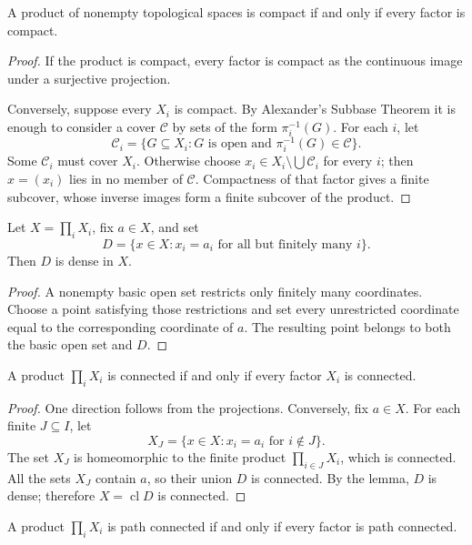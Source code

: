 \begin{thm}
A product of nonempty topological spaces is compact if and only if every
factor is compact.
\end{thm}

\begin{proof}
If the product is compact, every factor is compact as the continuous image
under a surjective projection.

Conversely, suppose every $X_i$ is compact. By Alexander's Subbase Theorem it
is enough to consider a cover $\mathcal{C}$ by sets of the form
$\pi_i^{-1}(G)$. For each $i$, let
\[
\mathcal{C}_i=\{G\subseteq X_i:G\text{ is open and }
\pi_i^{-1}(G)\in\mathcal{C}\}.
\]
Some $\mathcal{C}_i$ must cover $X_i$. Otherwise choose
$x_i\in X_i\setminus\bigcup\mathcal{C}_i$ for every $i$; then
$x=(x_i)$ lies in no member of $\mathcal{C}$. Compactness of that factor gives
a finite subcover, whose inverse images form a finite subcover of the product.
\end{proof}

\begin{lem}
Let $X=\prod_iX_i$, fix $a\in X$, and set
\[
D=\{x\in X:x_i=a_i\text{ for all but finitely many }i\}.
\]
Then $D$ is dense in $X$.
\end{lem}

\begin{proof}
A nonempty basic open set restricts only finitely many coordinates. Choose a
point satisfying those restrictions and set every unrestricted coordinate
equal to the corresponding coordinate of $a$. The resulting point belongs to
both the basic open set and $D$.
\end{proof}

\begin{thm}
A product $\prod_iX_i$ is connected if and only if every factor $X_i$ is
connected.
\end{thm}

\begin{proof}
One direction follows from the projections. Conversely, fix $a\in X$. For
each finite $J\subseteq I$, let
\[
X_J=\{x\in X:x_i=a_i\text{ for }i\notin J\}.
\]
The set $X_J$ is homeomorphic to the finite product $\prod_{i\in J}X_i$,
which is connected. All the sets $X_J$ contain $a$, so their union $D$ is
connected. By the lemma, $D$ is dense; therefore
$X=\operatorname{cl}D$ is connected.
\end{proof}

\begin{thm}
A product $\prod_iX_i$ is path connected if and only if every factor is path
connected.
\end{thm}


